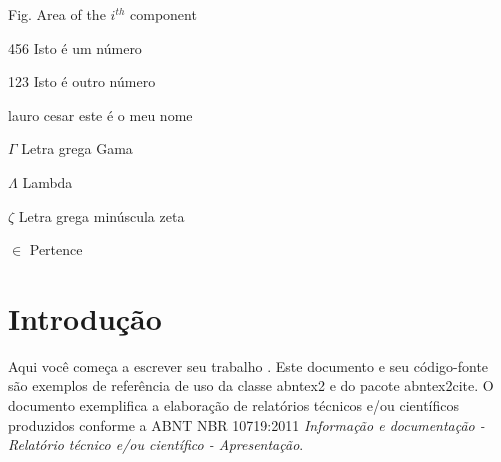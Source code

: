 \documentclass[
	12pt,				%
    oneside,			%
	a4paper,			%
	english,			%
	french,				%
	spanish,			%
	brazil,				%
	]{abntex2}
\begin{document}

\listoffigures* %
\cleardoublepage %


\listoftables*
\cleardoublepage

\begin{siglas}
  \item[Fig.] Area of the $i^{th}$ component
  \item[456] Isto é um número
  \item[123] Isto é outro número
  \item[lauro cesar] este é o meu nome
\end{siglas}

\begin{simbolos}
  \item[$ \Gamma $] Letra grega Gama
  \item[$ \Lambda $] Lambda
  \item[$ \zeta $] Letra grega minúscula zeta
  \item[$ \in $] Pertence
\end{simbolos}


\tableofcontents*


\textual


\chapter{Introdução} %

Aqui você começa a escrever seu trabalho \cite{fulano}. Este documento e seu código-fonte são exemplos de referência de uso da classe
\textsf{abntex2} e do pacote \textsf{abntex2cite}. O documento 
exemplifica a elaboração de relatórios técnicos e/ou científicos produzidos
conforme a ABNT NBR 10719:2011 \textit{Informação e documentação - Relatório
técnico e/ou científico - Apresentação}.
\end{document}
